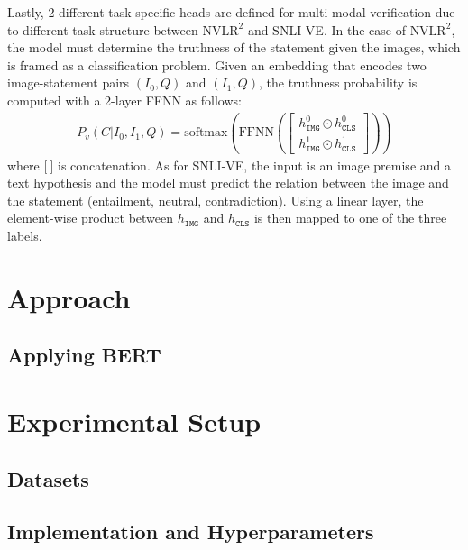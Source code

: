 \documentclass{article}
\begin{document}
Lastly, 2 different task-specific heads are defined for multi-modal verification due to different task structure between $\text{NVLR}^2$ and SNLI-VE. In the case of $\text{NVLR}^{2}$, the model must determine the truthness of the statement given the images, which is framed as a classification problem. Given an embedding that encodes two image-statement pairs $(I_{0}, Q)$ and $(I_{1}, Q)$, the truthness probability is computed with a 2-layer FFNN as follows:
\begin{align}
    P_{v}(C|I_{0}, I_{1}, Q) = \text{softmax}\left(\text{FFNN}\left(\begin{bmatrix} 
    h_{\mathtt{IMG}}^{0} \odot h_{\mathtt{CLS}}^{0} \\
    h_{\mathtt{IMG}}^{1} \odot h_{\mathtt{CLS}}^{1}
    \end{bmatrix}\right)\right)
\end{align}
where $\mathbb{[}\: \mathbb{]}$ is concatenation. As for SNLI-VE, the input is an image premise and a text hypothesis and the model must predict the relation between the image and the statement (entailment, neutral, contradiction). Using a linear layer, the element-wise product between $h_{\mathtt{IMG}}$ and $h_{\mathtt{CLS}}$ is then mapped to one of the three labels.



\section{Approach}
\subsection{Applying BERT}

\section{Experimental Setup}

\subsection{Datasets}

\subsection{Implementation and Hyperparameters}
\end{document}
